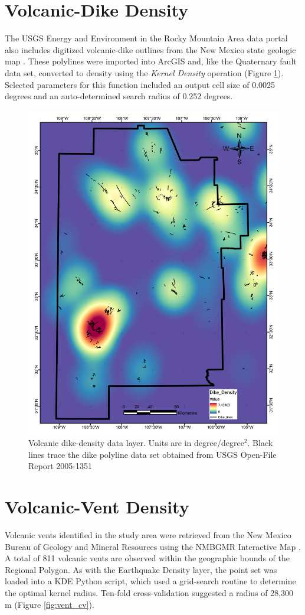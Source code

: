 \section{Volcanic-Dike Density}\label{app:dl_dike_density}
The USGS Energy and Environment in the Rocky Mountain Area data portal \citep{usgs_eerma_2021} also includes digitized volcanic-dike outlines from the New Mexico state geologic map \citep{stoeser_usgs_2005}. These polylines were imported into ArcGIS and, like the Quaternary fault data set, converted to density using the \textit{Kernel Density} operation (Figure \ref{fig:feat_dikes}). Selected parameters for this function included an output cell size of 0.0025 degrees and an auto-determined search radius of 0.252 degrees.

\begin{figure}[H]
\centering
\includegraphics[width=0.75\linewidth]{templates/images/Figure-DikeDensity.pdf}
\caption[Volcanic dike data layer]{Volcanic dike-density data layer. Units are in degree/degree$^2$. Black lines trace the dike polyline data set obtained from USGS Open-File Report 2005-1351 \protect\citep{stoeser_usgs_2005}}
\label{fig:feat_dikes}
\end{figure}

\section{Volcanic-Vent Density}\label{app:dl_vent_density}
Volcanic vents identified in the study area were retrieved from the New Mexico Bureau of Geology and Mineral Resources using the NMBGMR Interactive Map \citep{nmbgmr_nmbgmr_2021}. A total of 811 volcanic vents are observed within the geographic bounds of the Regional Polygon. As with the Earthquake Density layer, the point set was loaded into a KDE Python script, which used a grid-search routine to determine the optimal kernel radius. Ten-fold cross-validation suggested a radius of 28,300 m (Figure \ref{fig:vent_cv}).

